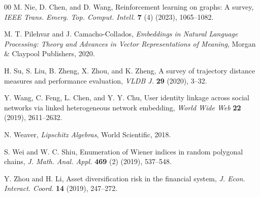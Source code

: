\documentclass[preprint,12pt]{elsarticle}
\begin{document}
\begin{thebibliography}{00}
 M. Nie, D. Chen, and D. Wang, Reinforcement learning on graphs: A survey, \textit{IEEE Trans. Emerg. Top. Comput. Intell.} \textbf{7} (4) (2023), 1065--1082.

 M. T. Pilehvar and J. Camacho-Collados, \textit{Embeddings in Natural Language Processing: Theory and Advances in Vector Representations of Meaning}, Morgan \& Claypool Publishers, 2020.

 H. Su, S. Liu, B. Zheng, X. Zhou, and K. Zheng, A survey of trajectory distance measures and performance evaluation, \textit{VLDB J.} \textbf{29} (2020), 3--32.

 Y. Wang, C. Feng, L. Chen, and Y. Y. Chu, User identity linkage across social networks via linked heterogeneous network embedding, \textit{World Wide Web} \textbf{22} (2019), 2611--2632.

 N. Weaver, \textit{Lipschitz Algebras}, World Scientific, 2018.

 S. Wei and W. C. Shiu, Enumeration of Wiener indices in random polygonal chains, \textit{J. Math. Anal. Appl.} \textbf{469} (2) (2019), 537--548.

 Y. Zhou and H. Li, Asset diversification risk in the financial system, \textit{J. Econ. Interact. Coord.} \textbf{14} (2019), 247--272.

\end{thebibliography}






\end{document}
